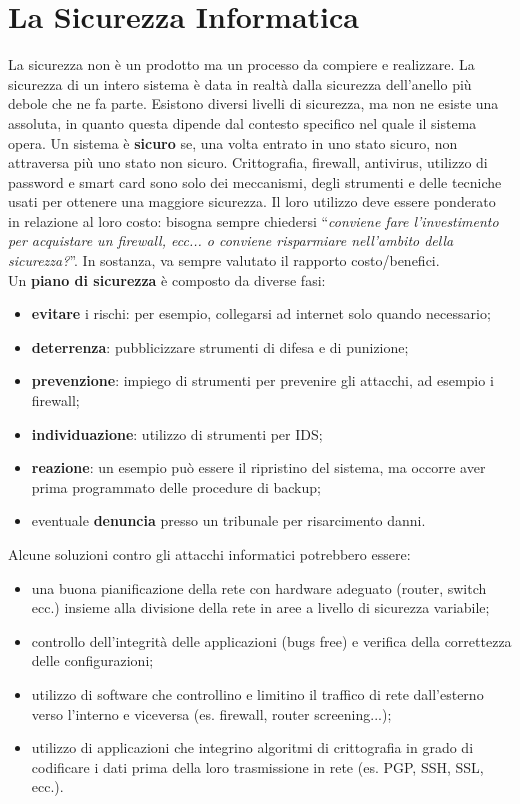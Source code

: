 \section{La Sicurezza Informatica}

La sicurezza non è un prodotto ma un processo da compiere e realizzare.
La sicurezza di un intero sistema è data in realtà dalla sicurezza dell'anello
più debole che ne fa parte. Esistono diversi livelli di sicurezza, ma non ne
esiste una assoluta, in quanto questa dipende dal contesto specifico nel quale
il sistema opera.
Un sistema è \textbf{sicuro} se, una volta entrato in uno stato sicuro, non
attraversa più uno stato non sicuro.
Crittografia, firewall, antivirus, utilizzo di password e smart card sono solo
dei meccanismi, degli strumenti e delle tecniche usati per ottenere una maggiore
sicurezza. Il loro utilizzo deve essere ponderato in relazione al loro costo:
bisogna sempre chiedersi “\textit{conviene fare l'investimento per acquistare un firewall,
      ecc... o conviene risparmiare nell'ambito della sicurezza?}”. In sostanza, va
sempre valutato il rapporto costo/benefici.\\
Un \textbf{piano di sicurezza} è composto da diverse fasi:

\begin{itemize}
      \item \textbf{evitare} i rischi: per esempio, collegarsi ad internet
            solo quando necessario;
      \item \textbf{deterrenza}: pubblicizzare strumenti di difesa e di punizione;
      \item \textbf{prevenzione}: impiego di strumenti per prevenire gli attacchi,
            ad esempio i firewall;
      \item \textbf{individuazione}: utilizzo di strumenti per IDS;
      \item \textbf{reazione}: un esempio può essere il ripristino del sistema,
            ma occorre aver prima programmato delle procedure di backup;
      \item eventuale \textbf{denuncia} presso un tribunale per risarcimento danni.
\end{itemize}

Alcune soluzioni contro gli attacchi informatici potrebbero essere:

\begin{itemize}
      \item una buona pianificazione della rete con hardware adeguato
            (router, switch ecc.) insieme alla divisione della rete in aree a livello
            di sicurezza variabile;
      \item controllo dell'integrità delle applicazioni (bugs free) e verifica
            della correttezza delle configurazioni;
      \item utilizzo di software che controllino e limitino il traffico di rete
            dall'esterno verso l'interno e viceversa (es. firewall, router screening...);
      \item utilizzo di applicazioni che integrino algoritmi di crittografia in
            grado di codificare i dati prima della loro trasmissione in rete
            (es. PGP, SSH, SSL, ecc.).
\end{itemize}

